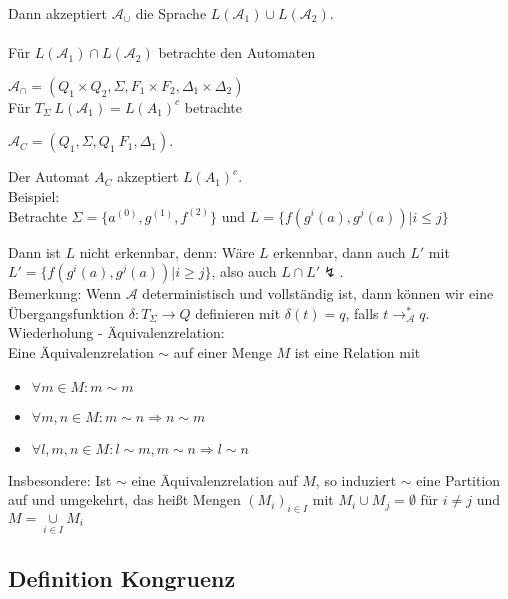 \documentclass[titlepage]{article}
\begin{document}
Dann akzeptiert $\mathcal{A}_\cup$ die Sprache $L(\mathcal{A}_1) \cup L(\mathcal{A}_2)$.\\ \\

F\"ur $L(\mathcal{A}_1) \cap L(\mathcal{A}_2)$ betrachte den Automaten

$\mathcal{A}_\cap = (Q_1 \times Q_2, \Sigma, F_1 \times F_2, \Delta_1 \times \Delta_2)$\\

F\"ur $T_\Sigma \ L(\mathcal{A}_1) = L(A_1)^c$ betrachte

$\mathcal{A}_C = (Q_1, \Sigma, Q_1 \ F_1, \Delta_1)$.

Der Automat $A_C$ akzeptiert $L(A_1)^c$.\\

Beispiel:\\

Betrachte $\Sigma = \{ a^{(0)}, g^{(1)}, f^{(2)}\}$ und 
$L = \{ f(g^i(a),g^j(a)) | i \leq j \}$

Dann ist $L$ nicht erkennbar, denn: W\"are $L$ erkennbar, dann auch $L'$ mit 
$L' = \{ f(g^i(a), g^j(a)) | i \geq j \}$, 
also auch $L \cap L' \lightning$. \\

Bemerkung: Wenn $\mathcal{A}$ deterministisch und vollst\"andig ist, 
dann k\"onnen wir eine \"Ubergangsfunktion 
$\delta: T_\Sigma \rightarrow Q$ definieren mit $\delta (t) = q$, falls 
$t \rightarrow_\mathcal{A}^\ast q$.\\

Wiederholung - \"Aquivalenzrelation:\\

Eine \"Aquivalenzrelation $\sim $ auf einer Menge $M$ ist eine Relation mit

\begin{itemize}
    \item $\forall m \in M: m\sim m$
    \item $\forall m, n \in M: m\sim n \Rightarrow n\sim m$
    \item $\forall l, m, n \in M: l\sim m, m\sim n \Rightarrow l\sim n$
\end{itemize}

Insbesondere: Ist $\sim $ eine \"Aquivalenzrelation auf $M$, so induziert $\sim $ eine 
Partition auf und umgekehrt, das hei\ss t Mengen 
$(M_i)_{i \in I}$ mit $M_i \cup M_j = \emptyset$ f\"ur $i \neq j$ und 
$M = \underset{i \in I}{\cup} M_i$

\subsection{Definition Kongruenz}
\end{document}
